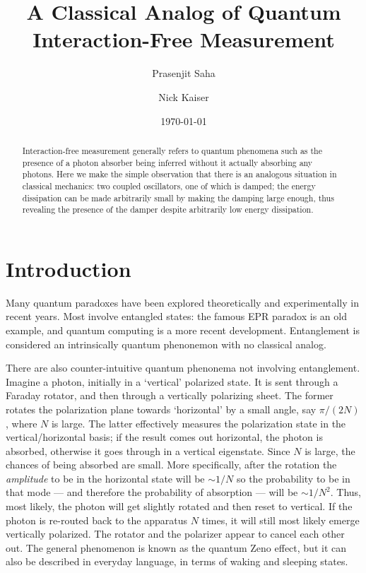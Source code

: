 \documentclass[prb,preprint]{revtex4-1}
\begin{document}
\title{A Classical Analog of Quantum Interaction-Free Measurement}

\author{Prasenjit Saha}
\author{Nick Kaiser}

\date{\today}

\begin{abstract}
Interaction-free measurement generally refers to quantum phenomena
such as the presence of a photon absorber being inferred without it
actually absorbing any photons.  Here we make the simple observation
that there is an analogous situation in classical mechanics: two
coupled oscillators, one of which is damped; the energy dissipation
can be made arbitrarily small by making the damping large enough, thus
revealing the presence of the damper despite arbitrarily low energy
dissipation.
\end{abstract}

\maketitle

\section{Introduction}

Many quantum paradoxes have been explored theoretically and
experimentally in recent years.  Most involve entangled states: the
famous EPR paradox is an old example, and quantum computing is a more
recent development\cite{2007qucosc.book}.  Entanglement is considered
an intrinsically quantum phenonemon with no classical analog.

There are also counter-intuitive quantum phenonema not involving
entanglement.  Imagine a photon, initially in a `vertical' polarized
state.  It is sent through a Faraday rotator, and then through a
vertically polarizing sheet.  The former rotates the polarization
plane towards `horizontal' by a small angle, say $\pi/(2N)$, where
$N$ is large.  The latter effectively measures the polarization state
in the vertical/horizontal basis; if the result comes out horizontal,
the photon is absorbed, otherwise it goes through in a vertical
eigenstate.  Since $N$ is large, the chances of being absorbed are
small.  More specifically, after the rotation the {\em amplitude\/} to
be in the horizontal state will be $\sim1/N$ so the probability to be
in that mode --- and therefore the probability of absorption --- will
be $\sim1/N^2$.  Thus, most likely, the photon will get slightly
rotated and then reset to vertical.  If the photon is re-routed back
to the apparatus $N$ times, it will still most likely emerge
vertically polarized.  The rotator and the polarizer appear to cancel
each other out.  The general phenomenon is known as the quantum Zeno
effect,\cite{1977JMP....18..756M,PhysRevA.41.2295} but it can also be
described in everyday language, in terms of waking and sleeping
states.\cite{orzel2009teach}
\end{document}
